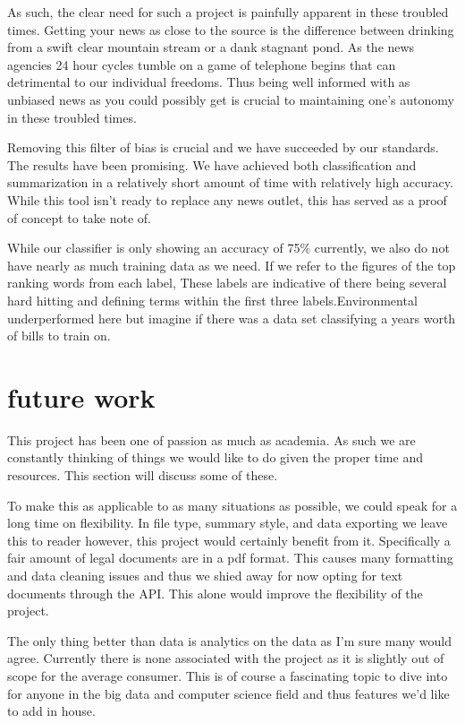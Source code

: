 \documentclass[11pt,a4paper]{article}
\begin{document}
As such, the clear need for such a project is painfully apparent in these troubled times. Getting your news as close to the source is the difference between drinking from a swift clear mountain stream or a dank stagnant pond. As the news agencies 24 hour cycles tumble on a game of telephone begins that can detrimental to our individual freedoms. Thus being well informed with as unbiased news as you could possibly get is crucial to maintaining one's autonomy in these troubled times.

Removing this filter of bias is crucial and we have succeeded by our standards. The results have been promising. We have achieved both classification and summarization in a relatively short amount of time with relatively high accuracy. While this tool isn't ready to replace any news outlet, this has served as a proof of concept to take note of. 

While our classifier is only showing an accuracy of 75\% currently, we also do not have nearly as much training data as we need. If we refer to the figures of the top ranking words from each label, These labels are indicative of there being several hard hitting and defining terms within the first three labels.Environmental underperformed here but imagine if there was a data set classifying a years worth of bills to train on. 

\section{future work}
This project has been one of passion as much as academia. As such we are constantly thinking of things we would like to do given the proper time and resources. This section will discuss some of these. 

To make this as applicable to as many situations as possible, we could speak for a long time on flexibility. In file type, summary style, and data exporting we leave this to reader however, this project would certainly benefit from it. Specifically a fair amount of legal documents are in a pdf format. This causes many formatting and data cleaning issues and thus we shied away for now opting for text documents through the API. This alone would improve the flexibility of the project. 

The only thing better than data is analytics on the data as I'm sure many would agree. Currently there is none associated with the project as it is slightly out of scope for the average consumer. This is of course a fascinating topic to dive into for anyone in the big data and computer science field and thus features we'd like to add in house. 
\end{document}
